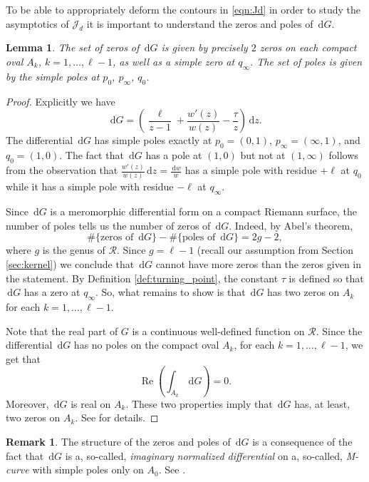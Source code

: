 \documentclass[11pt]{article}
\theoremstyle{plain}
\newtheorem{lemma}[theorem]{Lemma}
\theoremstyle{definition}
\newtheorem{remark}[theorem]{Remark}
\numberwithin{equation}{section}
\renewcommand{\d}{\,\mathrm{d}}
\DeclareMathOperator{\re}{Re}
\begin{document}
To be able to appropriately deform the contours in \eqref{eqn:Jd} in order to study the asymptotics of $\mathcal{J}_d$ it is important to understand the zeros and poles of $\d G$.
\begin{lemma}%
\label{lem:zerospoles}
The set of zeros of $\d G$ is given by precisely $2$ zeros on each compact oval $A_k$, $k=1,\dots,\ell-1$, as well as a simple zero at $q_{\infty}$. The set of poles is given by the simple poles at $p_0$, $p_{\infty}$, $q_0$.
\end{lemma}
\begin{proof}
Explicitly we have
$$\d G=\left(\frac{\ell}{z-1}+\frac{w'(z)}{w(z)}-\frac{\tau }{z}\right)\d z.$$
The differential $\d G$ has simple poles exactly at $p_0=(0,1)$, $p_{\infty}=(\infty,1)$, and $q_0=(1,0)$. The fact that $\d G$ has a pole at $(1,0)$ but not at $(1,\infty)$ follows from the observation that $\frac{w'(z)}{w(z)}\d z=\frac{\d w}{w}$ has a simple pole with residue $+\ell$ at $q_0$ while it has a simple pole with residue $-\ell$ at $q_\infty$. 

Since $\d G$ is a meromorphic differential form on a compact Riemann surface, the number of poles tells us the number of zeros of $\d G$. Indeed, by Abel's theorem, 
\begin{equation}
\#\text{\{zeros of $\d G$\}}-\#\text{\{poles of $\d G$\}}=2g-2,
\end{equation}
where $g$ is the genus of $\mathcal R$. Since $g=\ell-1$ (recall our assumption from Section \ref{sec:kernel}) we conclude that $\d G$ cannot have more zeros than the zeros given in the statement. By Definition \ref{def:turning_point}, the constant $\tau $ is defined so that $\d G$ has a zero at $q_\infty$. So, what remains to show is that $\d G$ has two zeros on $A_k$ for each $k=1,\dots,\ell-1$. 

Note that the real part of $G$ is a continuous well-defined function on $\mathcal R$. Since the differential $\d G$ has no poles on the compact oval $A_k$, for each $k=1,\dots,\ell-1$, we get that
\begin{equation}
\re \left(\int_{A_k} \d G\right)=0.
\end{equation}
Moreover, $\d G$ is real on $A_k$. These two properties imply that $\d G$ has, at least, two zeros on $A_k$. See \cite{DK21, Ber21, BB23} for details. 
\end{proof}
%
%
\begin{remark}
The structure of the zeros and poles of $\d G$ is a consequence of the fact that $\d G$ is a, so-called, \emph{imaginary normalized differential} on a, so-called, \emph{M-curve} with simple poles only on $A_0$. See \cite[Lemma 4.2]{Kri13}.
\end{remark}
\end{document}
